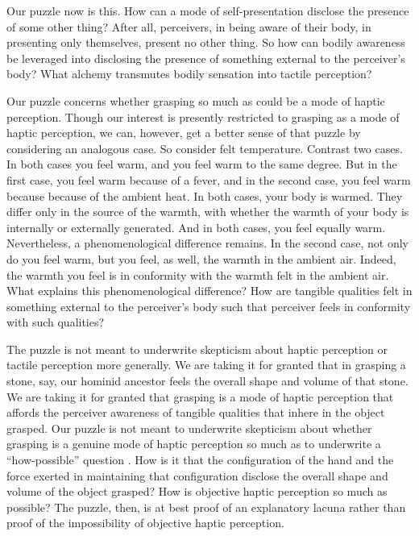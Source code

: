Our puzzle now is this. How can a mode of self-presentation disclose the presence of some other thing? After all, perceivers, in being aware of their body, in presenting only themselves, present no other thing. So how can bodily awareness be leveraged into disclosing the presence of something external to the perceiver's body? What alchemy transmutes bodily sensation into tactile perception?

Our puzzle concerns whether grasping so much as could be a mode of haptic perception. Though our interest is presently restricted to grasping as a mode of haptic perception, we can, however, get a better sense of that puzzle by considering an analogous case. So consider felt temperature. Contrast two cases. In both cases you feel warm, and you feel warm to the same degree. But in the first case, you feel warm because of a fever, and in the second case, you feel warm because because of the ambient heat. In both cases, your body is warmed. They differ only in the source of the warmth, with whether the warmth of your body is internally or externally generated. And in both cases, you feel equally warm. Nevertheless, a phenomenological difference remains. In the second case, not only do you feel warm, but you feel, as well, the warmth in the ambient air. Indeed, the warmth you feel is in conformity with the warmth felt in the ambient air. What explains this phenomenological difference? How are tangible qualities felt in something external to the perceiver's body such that perceiver feels in conformity with such qualities?

The puzzle is not meant to underwrite skepticism about haptic perception or tactile perception more generally. We are taking it for granted that in grasping a stone, say, our hominid ancestor feels the overall shape and volume of that stone. We are taking it for granted that grasping is a mode of haptic perception that affords the perceiver awareness of tangible qualities that inhere in the object grasped. Our puzzle is not meant to underwrite skepticism about whether grasping is a genuine mode of haptic perception so much as to underwrite a ``how-possible'' question \citep{Cassam:2007lq}. How is it that the configuration of the hand and the force exerted in maintaining that configuration disclose the overall shape and volume of the object grasped? How is objective haptic perception so much as possible? The puzzle, then, is at best proof of an explanatory lacuna rather than proof of the impossibility of objective haptic perception.

